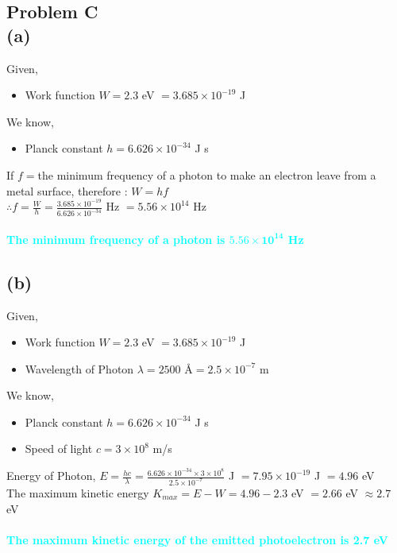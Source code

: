 \documentclass[14pt]{article}
\begin{document}
\begin{center}
	\section*{\textcolor{goldColor}{\textbf{Problem C\\(a)}}}
\end{center}
Given,
\begin{itemize}
    \item Work function $W=2.3$ eV $=3.685\times10^{-19}$ J
\end{itemize}
We know,
\begin{itemize}
    \item Planck constant $h=6.626\times10^{-34}$ J s
\end{itemize}
If $f=$the minimum frequency of a photon to make an electron leave from a metal surface, therefore : $W=hf$\\
$\therefore f=\frac{W}{h}=\frac{3.685\times10^{-19}}{6.626\times10^{-34}}$ Hz $=5.56\times10^{14}$ Hz\\\\
\textcolor{cyan}{\textbf{The minimum frequency of a photon is $\mathbf{5.56\times10^{14}}$ Hz}}

\begin{center}
    \section*{\textcolor{goldColor}{\textbf{(b)}}}
\end{center}
Given,
\begin{itemize}
    \item Work function $W=2.3$ eV $=3.685\times10^{-19}$ J
    \item Wavelength of Photon $\lambda=2500$ \AA $=2.5\times10^{-7}$ m
\end{itemize}
We know,
\begin{itemize}
    \item Planck constant $h=6.626\times10^{-34}$ J s
    \item Speed of light $c=3\times10^8$ m/s
\end{itemize}
Energy of Photon, $E=\frac{hc}{\lambda}=\frac{6.626\times10^{-34}\times3\times10^8}{2.5\times10^{-7}}$ J $=7.95\times10^{-19}$ J $=4.96$ eV\\
The maximum kinetic energy $K_{max}=E-W=4.96-2.3$ eV $=2.66$ eV $\approx 2.7$ eV\\\\
\textcolor{cyan}{\textbf{The maximum kinetic energy of the emitted photoelectron is 2.7 eV}}
\end{document}
